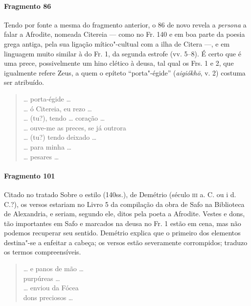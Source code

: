 \paragraph{Fragmento 86}

{\small Tendo por fonte a mesma do fragmento anterior, o 86 de novo revela a \textit{persona} a falar a Afrodite, nomeada Citereia --- como no Fr. 140 e em boa parte da poesia grega antiga, pela sua ligação mítico"-cultual com a ilha de Citera ---, e em linguagem muito similar à do Fr. 1, da segunda estrofe (vv. 5--8). É certo que é uma prece, possivelmente um hino clético à deusa, tal qual os Frs. 1 e 2, que igualmente refere Zeus, a quem o epíteto ``porta"-égide'' (\textit{aigiókhō}, v. 2) costuma ser atribuído.}

\begin{verse}
\ldots{} porta-égide \ldots{}\\
\ldots{} ó Citereia, eu rezo \ldots{}\\
\ldots{} (tu?), tendo \ldots{} coração \ldots{}\\
\ldots{} ouve-me as preces, se já outrora\\
\ldots{} (tu?) tendo deixado \ldots{}\\
\ldots{} para minha \ldots{}\\
\ldots{} pesares \ldots{}
\end{verse}

\paragraph{Fragmento 101}

{\small Citado no tratado Sobre o estilo (140ss.), de Demétrio (século \textsc{iii} a. C. ou i d. C.?), os versos estariam no Livro 5 da compilação da obra de Safo na Biblioteca de Alexandria, e seriam, segundo ele, ditos pela poeta a Afrodite. Vestes e dons, tão importantes em Safo e marcados na deusa no Fr. 1 estão em cena, mas não podemos recuperar seu sentido. Demétrio explica que o primeiro dos elementos destina"-se a enfeitar a cabeça; os versos estão severamente corrompidos; traduzo os termos compreensíveis.}

\begin{verse}
\ldots{} e panos de mão \ldots{}\\
purpúreas \ldots{}\\
\ldots{} enviou da Fócea\\
dons preciosos \ldots{}
\end{verse}

